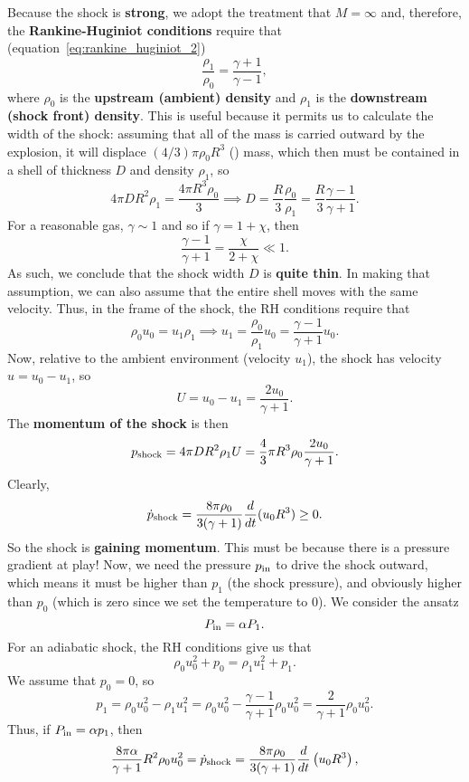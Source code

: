 \vspace{0.25cm}
Because the shock is \textbf{strong}, we adopt the treatment that $M = \infty$ and, therefore, the \textbf{Rankine-Huginiot conditions} require that (equation~\ref{eq:rankine_huginiot_2})
\[
\frac{\rho_1}{\rho_0} = \frac{\gamma +1 }{\gamma -1},
\]
where $\rho_0$ is the \textbf{upstream (ambient) density} and $\rho_1$ is the \textbf{downstream (shock front) density}. This is useful because it permits us to calculate the width of the shock: assuming that all of the mass is carried outward by the explosion, it will displace $(4/3)\pi \rho_0 R^3$  () mass, which then must be contained in a shell of thickness $D$ and density $\rho_1$, so
\[
4\pi D R^2 \rho_1 = \frac{4\pi R^3 \rho_0}{3} \implies D = \frac{R}{3}\frac{\rho_0}{\rho_1} = \frac{R}{3} \frac{\gamma - 1}{\gamma + 1}.
\]
For a reasonable gas, $\gamma \sim 1$ and so if $\gamma = 1 + \chi$, then
\[
\frac{\gamma - 1}{\gamma +1} = \frac{\chi}{2+\chi} \ll 1.
\]
As such, we conclude that the shock width $D$ is \textbf{quite thin}. In making that assumption, we can also assume that the entire shell moves with the same velocity. Thus, in the frame of the shock, the RH conditions require that
\[
\rho_0u_0 = u_1\rho_1 \implies u_1 = \frac{\rho_0}{\rho_1}u_0 = \frac{\gamma - 1}{\gamma + 1} u_0.
\]
Now, relative to the ambient environment (velocity $u_1$), the shock has velocity $u = u_0-u_1$, so
\[
U = u_0-u_1  = \frac{2u_0}{\gamma + 1}.
\]
The \textbf{momentum of the shock} is then
\[
p_{\rm shock} = 4\pi D R^2 \rho_1 U = \frac{4}{3}\pi R^3 \rho_0 \frac{2u_0}{\gamma + 1}.
\]
Clearly,
\[
\dot{p}_{\rm shock} = \frac{8\pi \rho_0}{3(\gamma + 1)} \frac{d}{dt}(u_0R^3) \ge 0. 
\]
So the shock is \textbf{gaining momentum}. This must be because there is a pressure gradient at play! Now, we need the pressure $p_{\rm in}$ to drive the shock outward, which means it must be higher than $p_1$ (the shock pressure), and obviously higher than $p_0$ (which is zero since we set the temperature to 0). We consider the ansatz
\[
P_{\rm in} = \alpha P_{1}.
\]
 For an adiabatic shock, the RH conditions give us that
\[
\rho_0 u_0^2 + p_0 = \rho_1u_1^2 + p_1.
\]
We assume that $p_0 = 0$, so 
\[
p_1 = \rho_0u_0^2 - \rho_1 u_1^2 = \rho_0u_0^2 - \frac{\gamma - 1}{\gamma + 1} \rho_0 u_0^2 = \frac{2}{\gamma +1} \rho_0 u_0^2.
\]
Thus, if $P_{\rm in} = \alpha p_1$, then
\[
\frac{8\pi \alpha}{\gamma +1} R^2\rho_0u_0^2 = \dot{p}_{\rm shock} = \frac{8\pi \rho_0}{3(\gamma + 1)} \frac{d}{dt}\left(u_0R^3\right),
\]
